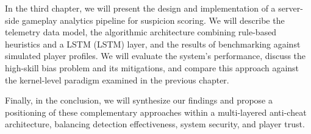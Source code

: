 In the third chapter, we will present the design and implementation of a server-side gameplay analytics pipeline for suspicion scoring. We will describe the telemetry data model, the algorithmic architecture combining rule-based heuristics and a \gls{LSTM} (LSTM) layer, and the results of benchmarking against simulated player profiles. We will evaluate the system's performance, discuss the high-skill bias problem and its mitigations, and compare this approach against the kernel-level paradigm examined in the previous chapter.

Finally, in the conclusion, we will synthesize our findings and propose a positioning of these complementary approaches within a multi-layered anti-cheat architecture, balancing detection effectiveness, system security, and player trust.
